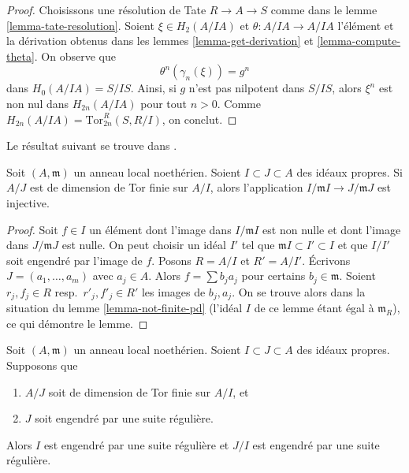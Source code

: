 \begin{proof}
Choisissons une résolution de Tate $R \to A \to S$ comme dans le
lemme \ref{lemma-tate-resolution}.
Soient $\xi \in H_2(A/IA)$ et $\theta : A/IA \to A/IA$ l'élément
et la dérivation obtenus dans les lemmes \ref{lemma-get-derivation} et
\ref{lemma-compute-theta}.
On observe que
$$
\theta^n(\gamma_n(\xi)) = g^n
$$
dans $H_0(A/IA) = S/IS$.
Ainsi, si $g$ n'est pas nilpotent dans $S/IS$, alors $\xi^n$ est non nul dans
$H_{2n}(A/IA)$ pour tout $n > 0$. Comme
$H_{2n}(A/IA) = \text{Tor}^R_{2n}(S, R/I)$, on conclut.
\end{proof}

\noindent
Le résultat suivant se trouve dans \cite{Rodicio}.

\begin{lemma}
\label{lemma-injective}
Soit $(A, \mathfrak m)$ un anneau local noethérien. Soient
$I \subset J \subset A$ des idéaux propres. Si $A/J$ est de dimension
de Tor finie sur $A/I$, alors l'application
$I/\mathfrak m I \to J/\mathfrak m J$ est injective.
\end{lemma}

\begin{proof}
Soit $f \in I$ un élément dont l'image dans $I/\mathfrak m I$ est non nulle
et dont l'image dans $J/\mathfrak mJ$ est nulle. On peut choisir un idéal $I'$
tel que $\mathfrak mI \subset I' \subset I$ et que $I/I'$ soit engendré par
l'image de $f$. Posons $R = A/I$ et $R' = A/I'$. Écrivons
$J = (a_1, \ldots, a_m)$
avec $a_j \in A$. Alors $f = \sum b_j a_j$ pour certains
$b_j \in \mathfrak m$.
Soient $r_j, f_j \in R$ resp.\ $r'_j, f'_j \in R'$ les images de
$b_j, a_j$. On se trouve alors
dans la situation du lemme \ref{lemma-not-finite-pd}
(l'idéal $I$ de ce lemme étant égal à $\mathfrak m_R$),
ce qui démontre le lemme.
\end{proof}

\begin{lemma}
\label{lemma-regular-sequence}
Soit $(A, \mathfrak m)$ un anneau local noethérien. Soient
$I \subset J \subset A$ des idéaux propres. Supposons que
\begin{enumerate}
\item $A/J$ soit de dimension de Tor finie sur $A/I$, et
\item $J$ soit engendré par une suite régulière.
\end{enumerate}
Alors $I$ est engendré par une suite régulière et $J/I$
est engendré par une suite régulière.
\end{lemma}

